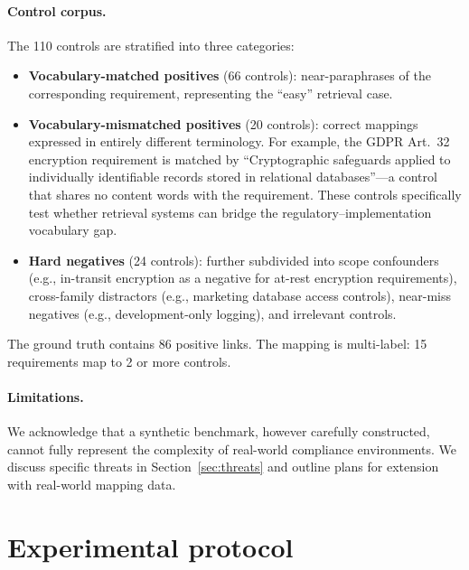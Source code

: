 \documentclass[a4paper,fleqn]{cas-sc}
\begin{document}
\paragraph{Control corpus.}
The 110 controls are stratified into three categories:
\begin{itemize}
    \item \textbf{Vocabulary-matched positives} (66 controls): near-paraphrases of the corresponding requirement, representing the ``easy'' retrieval case.

    \item \textbf{Vocabulary-mismatched positives} (20 controls): correct mappings expressed in entirely different terminology.
    For example, the GDPR Art.~32 encryption requirement is matched by ``Cryptographic safeguards applied to individually identifiable records stored in relational databases''---a control that shares no content words with the requirement.
    These controls specifically test whether retrieval systems can bridge the regulatory--implementation vocabulary gap.

    \item \textbf{Hard negatives} (24 controls): further subdivided into scope confounders (e.g., in-transit encryption as a negative for at-rest encryption requirements), cross-family distractors (e.g., marketing database access controls), near-miss negatives (e.g., development-only logging), and irrelevant controls.
\end{itemize}

The ground truth contains 86 positive links. The mapping is multi-label: 15 requirements map to 2 or more controls.

\paragraph{Limitations.}
We acknowledge that a synthetic benchmark, however carefully constructed, cannot fully represent the complexity of real-world compliance environments.
We discuss specific threats in Section~\ref{sec:threats} and outline plans for extension with real-world mapping data.


\section{Experimental protocol}
\label{sec:protocol}
\end{document}
